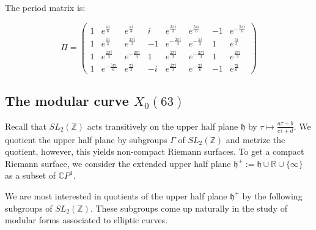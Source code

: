 \documentclass[12pt,reqno]{amsart}
\newcommand{\C}{\mathbb{C}}
\newcommand{\Z}{\mathbb{Z}}
\newcommand{\R}{\mathbb{R}}
\newtheorem*{thm*}{Theorem}
\theoremstyle{definition}
\theoremstyle{remark}
\begin{document}




The period matrix is:

$$\Pi = \begin{pmatrix}
 1 & e^{\frac{\pi i}{6}} & e^{\frac{\pi i}{3}} & i & e^{\frac{2 \pi i}{3}} & e^{\frac{5 \pi i}{6}} & -1 & e^{-\frac{5 \pi i}{6}} \\
 1 & e^{\frac{\pi i}{3}} & e^{\frac{2 \pi i}{3}} & -1 & e^{-\frac{2 \pi i}{3}} & e^{-\frac{\pi i}{3}} & 1 & e^{\frac{\pi i}{3}} \\
 1 & e^{\frac{2 \pi i}{3}} & e^{-\frac{2 \pi i}{3}} & 1 & e^{\frac{2 \pi i}{3}} & e^{-\frac{2 \pi i}{3}} & 1 & e^{\frac{2 \pi i}{3}} \\
 1 & e^{-\frac{5 \pi i}{6}} & e^{\frac{\pi i}{3}} & -i & e^{\frac{2 \pi i}{3}} & e^{-\frac{\pi i}{6}} & -1 & e^{\frac{\pi i}{6}} 
\end{pmatrix}$$
\newpage
 
\subsection{The modular curve $X_0(63)$}
\label{sec:modular}
Recall that $SL_2(\Z)$ acts transitively on the upper half plane $\mathfrak{h}$ by $\tau \mapsto \frac{a\tau + b}{c\tau + d}$. We quotient the upper half plane by subgroups $\Gamma$ of $SL_2(\Z)$ and metrize the quotient, however, this yields non-compact Riemann surfaces. To get a compact Riemann surface, we consider the extended upper half plane $\mathfrak{h}^{+} := \mathfrak{h} \cup \R \cup \{ \infty \}$ as a subset of $\C P^1$.  

We are most interested in quotients of the upper half plane $\mathfrak{h}^{+}$ by the following subgroups of $SL_2(\Z)$. These subgroups come up naturally in the study of modular forms associated to elliptic curves.
\end{document}
